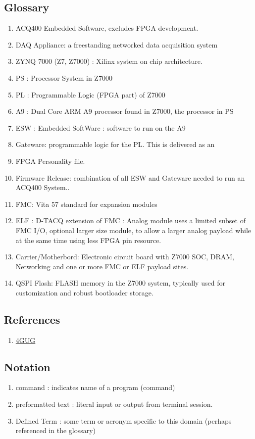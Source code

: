 \documentclass[]{article}
\begin{document}
\subsection{Glossary}
\begin{enumerate}
    \item ACQ400 Embedded Software, excludes FPGA development.
    \item DAQ Appliance: a freestanding networked data acquisition system
    \item ZYNQ 7000 (Z7, Z7000)  : Xilinx system on chip architecture.
    \item PS : Processor System in Z7000
    \item PL : Programmable Logic (FPGA part) of Z7000
    \item A9 : Dual Core ARM A9 processor found in Z7000, the processor in PS
    \item ESW : Embedded SoftWare : software to run on the A9
    \item Gateware: programmable logic for the PL. This is delivered as an 
    \item FPGA Personality file.
    \item Firmware Release: combination of all ESW and Gateware needed to run an ACQ400 System..
    \item FMC: Vita 57 standard for expansion modules
    \item ELF : D-TACQ extension of FMC : Analog module uses a limited subset of FMC I/O, optional larger size module, to allow a larger analog payload while at the same time using less FPGA pin resource.
    \item Carrier/Motherbord: Electronic circuit board with Z7000 SOC, DRAM, Networking and one or more FMC or ELF payload sites.
    \item QSPI Flash: FLASH memory in the Z7000 system, typically used for customization and robust bootloader storage.       
\end{enumerate}

\subsection{References}
\begin{enumerate}
    \item \href{https://github.com/seanalsop/bolodsp-doc/releases}{4GUG}
\end{enumerate} 

\subsection{Notation}
\begin{enumerate}
    \item command   : indicates name of a program (command)
    \item preformatted text : literal input or output from terminal session.
    \item Defined Term : some term or acronym specific to this domain (perhaps referenced in the glossary)
\end{enumerate} 
\end{document}
